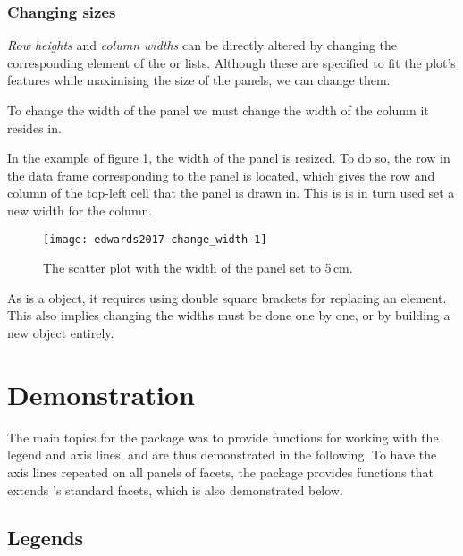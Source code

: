 \subsubsection{Changing sizes}

\emph{Row heights} and \emph{column widths} can be directly altered by
changing the corresponding element of the  or
  lists. Although these are specified to
fit the plot's features while maximising the size of the panels, we can
change them.

To change the width of the panel we must change the width of the column
it resides in.

In the example of figure \ref{fig:change_width}, the width of the panel
is resized. To do so, the row in the  data frame
corresponding to the panel is located, which gives the row and column of
the top-left cell that the panel is drawn in. This is is in turn used
set a new width for the column.

\begin{figure}[h!] 

\texttt{[image: edwards2017-change\_width-1]}

\caption{The scatter plot with the width of the panel set to 5\,cm.}
  \label{fig:change_width} \end{figure}

As  is a  object, it requires using
double square brackets for replacing an element. This also implies
changing the widths must be done one by one, or by building a new
 object entirely.

\section{Demonstration}

The main topics for the  package was to provide functions for
working with the legend and axis lines, and are thus demonstrated in the
following. To have the axis lines repeated on all panels of facets, the
package provides functions that extends 's standard
facets, which is also demonstrated below.

\subsection{Legends}

